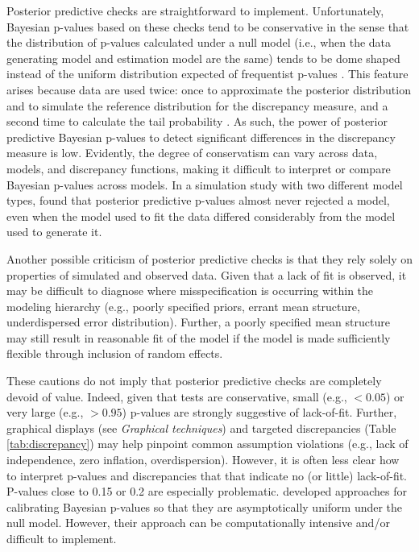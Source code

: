 \documentclass[12pt,english]{article}
\begin{document}
\begin{spacing}{1.9}
Posterior predictive checks are straightforward to implement.  Unfortunately, Bayesian p-values based on these checks tend to be conservative in the sense that the distribution of p-values calculated under a null model (i.e., when the data generating model and estimation model are the same) tends to be dome shaped instead of the uniform distribution expected of frequentist p-values \citep{RobinsEtAl2000}. This feature arises because data are used twice: once to approximate the posterior distribution and to simulate the reference distribution for the discrepancy measure, and a second time to calculate the tail probability  \citep{BayarriBerger2000}.  As such, the power of posterior predictive Bayesian p-values to detect significant differences in the discrepancy measure is low.  Evidently, the degree of conservatism can vary across data, models, and discrepancy functions, making it difficult to interpret or compare Bayesian p-values across models. In a simulation study with two different model types, \citet{Zhang2014} found that posterior predictive p-values almost never rejected a model, even when the model used to fit the data differed considerably from the model used to generate it.

Another possible criticism of posterior predictive checks is that they rely solely on properties of simulated and observed data.  Given that a lack of fit is observed, it may be difficult to diagnose where misspecification is occurring within the modeling hierarchy (e.g., poorly specified priors, errant mean structure, underdispersed error distribution).  Further, a poorly specified mean structure may still result in reasonable fit of the model if the model is made sufficiently flexible through inclusion of random effects.

These cautions do not imply that posterior predictive checks are completely devoid of value.  Indeed, given that tests are conservative, small (e.g., $<0.05$) or very large (e.g., $>0.95$) p-values are strongly suggestive of lack-of-fit.  Further, graphical displays (see \textit{Graphical techniques}) and targeted discrepancies (Table \ref{tab:discrepancy}) may help pinpoint common assumption violations (e.g., lack of independence, zero inflation, overdispersion).  However, it is often less clear how to interpret p-values and discrepancies that that indicate no (or little) lack-of-fit. P-values close to 0.15 or 0.2 are especially problematic.
\citet{HjortEtAl2006} developed approaches for calibrating Bayesian p-values so that they are asymptotically uniform under the null model.  However, their approach can be computationally intensive and/or difficult to implement.


\end{spacing}
\end{document}
